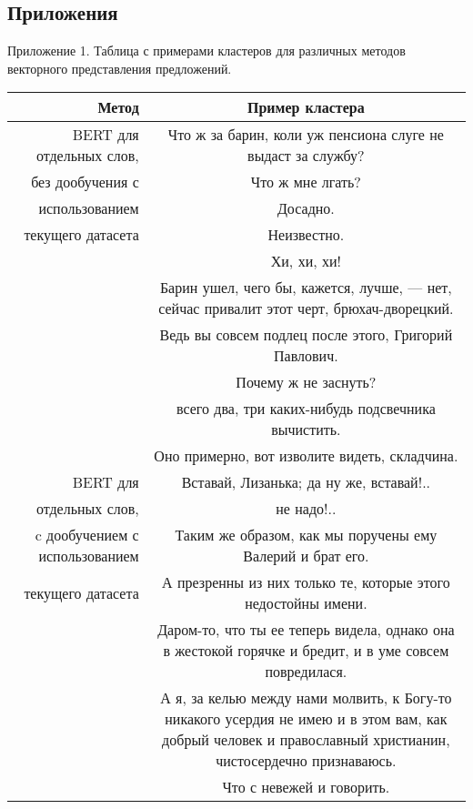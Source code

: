 \documentclass[a4paper,14pt]{article}
\begin{document}
\pagebreak

\begin{center}
	\section*{Приложения}
\end{center}
\begin{flushright}
Приложение 1. Таблица с примерами кластеров для различных методов векторного представления предложений.
\end{flushright}
\begin{center}
\begin{tabularx}{\linewidth}{ | N | C | }

\hline
Метод & Пример кластера \\ \hline
BERT для отдельных слов, & Что ж за барин, коли уж пенсиона слуге не выдаст за службу? \\
без дообучения с & Что ж мне лгать? \\ 
использованием & Досадно. \\
текущего датасета & Неизвестно. \\
& Хи, хи, хи! \\
& Барин ушел, чего бы, кажется, лучше, — нет, сейчас привалит этот черт, брюхач-дворецкий.  \\
& Ведь вы совсем             подлец после этого, Григорий Павлович.  \\
& Почему ж не заснуть? \\
& всего два, три каких-нибудь подсвечника вычистить. \\
& Оно примерно, вот изволите видеть, складчина. \\
\hline
BERT для &Вставай, Лизанька; да ну же, вставай!..\\
отдельных слов, &не надо!..\\
c дообучением с использованием&Таким же образом, как мы поручены ему Валерий и брат его.\\
текущего датасета&А презренны из них только те, которые этого недостойны имени.\\
&Даром-то, что ты ее теперь видела, однако она в жестокой горячке и бредит, и в уме             совсем повредилася.\\
&А я, за келью между нами молвить, к Богу-то никакого усердия не имею и в этом вам, как добрый человек и православный             христианин, чистосердечно признаваюсь.\\
&Что с невежей и говорить.\\ \hline

\end{tabularx}
\end{center}
\end{document}
